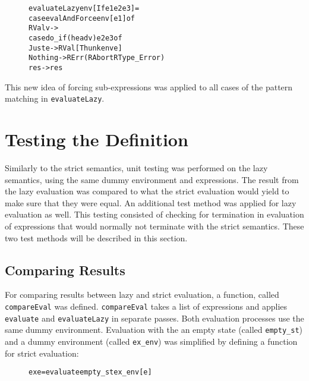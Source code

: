 \begin{figure}[H]
\begin{alltt}
  evaluateLazy env [If e1 e2 e3]   =
    case evalAndForce env [e1] of
      RVal v ->
        case do_if (head v) e2 e3 of
          Just e  -> RVal [Thunk env e]
          Nothing -> RErr (RAbort RType_Error)
      res -> res
\end{alltt}
\end{figure}

This new idea of forcing sub-expressions was applied to all cases of the
pattern matching in \texttt{evaluateLazy}.

\section{Testing the Definition}

Similarly to the strict semantics, unit testing was performed on the lazy
semantics, using the same dummy environment and expressions. 
The result from the lazy evaluation was compared to what the strict evaluation
would yield to make sure that they were equal. An additional test method was
applied for lazy evaluation as well. This testing consisted of checking for
termination in evaluation of expressions that would normally not terminate with
the strict semantics. These two test methods will be described in this section.

\subsection{Comparing Results}
For comparing results between lazy and strict evaluation, a function, called
\texttt{compareEval} was defined. \texttt{compareEval} takes a list of
expressions and applies \texttt{evaluate} and \texttt{evaluateLazy}
in separate passes. Both evaluation processes use the same dummy environment.
Evaluation with the an empty state (called \texttt{empty\_st}) and
a dummy environment (called \texttt{ex\_env}) was simplified by defining a
function for strict evaluation:

\begin{figure}[H]
\begin{alltt}
  ex e = evaluate empty_st ex_env [e]
\end{alltt}
\end{figure}

